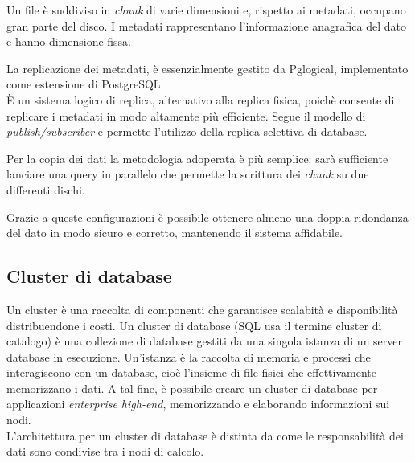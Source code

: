 Un file \`{e} suddiviso in \textit{chunk} di varie dimensioni e, rispetto ai metadati, occupano gran parte del disco. I metadati rappresentano l'informazione anagrafica del dato e hanno dimensione fissa.

La replicazione dei metadati, \`{e} essenzialmente gestito da Pglogical, implementato come estensione di PostgreSQL. \\
\`{E} un sistema logico di replica, alternativo alla replica fisica, poich\`{e} consente di replicare i metadati in modo altamente pi\`{u} efficiente. Segue il modello di \textit{publish/subscriber} e permette l'utilizzo della replica selettiva di database.

Per la copia dei dati la metodologia adoperata \`{e} pi\`{u} semplice: sar\`{a} sufficiente lanciare una query in parallelo che permette la scrittura dei \textit{chunk} su due differenti dischi.

Grazie a queste configurazioni \`{e} possibile ottenere almeno una doppia ridondanza del dato in modo sicuro e corretto, mantenendo il sistema affidabile.

\item
\subsection{Cluster di database}
Un cluster \`{e} una raccolta di componenti che garantisce scalabit\`{a} e disponibilit\`{a} distribuendone i costi. Un cluster di database (SQL usa il termine cluster di catalogo) \`{e} una collezione di database gestiti da una singola istanza di un server database in esecuzione. Un'istanza \`{e} la raccolta di memoria e processi che interagiscono con un database, cio\`{e} l'insieme di file fisici che effettivamente memorizzano i dati.\cite{etichetta1} A tal fine, \`{e} possibile creare un cluster di database per applicazioni \textit{enterprise high-end}, memorizzando e elaborando informazioni sui nodi.\\ L'architettura per un cluster di database \`{e} distinta da come le responsabilit\`{a} dei dati sono condivise tra i nodi di calcolo.

